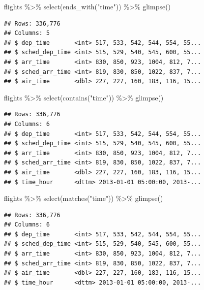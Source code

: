 \documentclass[
]{book}
\newenvironment{Shaded}{\begin{snugshade}}{\end{snugshade}}
\newcommand{\FunctionTok}[1]{\textcolor[rgb]{0.00,0.00,0.00}{#1}}
\newcommand{\NormalTok}[1]{#1}
\newcommand{\SpecialCharTok}[1]{\textcolor[rgb]{0.00,0.00,0.00}{#1}}
\newcommand{\StringTok}[1]{\textcolor[rgb]{0.31,0.60,0.02}{#1}}
\begin{document}
\begin{Shaded}
\begin{Highlighting}[]
\NormalTok{flights }\SpecialCharTok{\%\textgreater{}\%} 
  \FunctionTok{select}\NormalTok{(}\FunctionTok{ends\_with}\NormalTok{(}\StringTok{"time"}\NormalTok{)) }\SpecialCharTok{\%\textgreater{}\%} 
  \FunctionTok{glimpse}\NormalTok{()}
\end{Highlighting}
\end{Shaded}

\begin{verbatim}
## Rows: 336,776
## Columns: 5
## $ dep_time       <int> 517, 533, 542, 544, 554, 55...
## $ sched_dep_time <int> 515, 529, 540, 545, 600, 55...
## $ arr_time       <int> 830, 850, 923, 1004, 812, 7...
## $ sched_arr_time <int> 819, 830, 850, 1022, 837, 7...
## $ air_time       <dbl> 227, 227, 160, 183, 116, 15...
\end{verbatim}

\begin{Shaded}
\begin{Highlighting}[]
\NormalTok{flights }\SpecialCharTok{\%\textgreater{}\%} 
  \FunctionTok{select}\NormalTok{(}\FunctionTok{contains}\NormalTok{(}\StringTok{"time"}\NormalTok{)) }\SpecialCharTok{\%\textgreater{}\%} 
  \FunctionTok{glimpse}\NormalTok{()}
\end{Highlighting}
\end{Shaded}

\begin{verbatim}
## Rows: 336,776
## Columns: 6
## $ dep_time       <int> 517, 533, 542, 544, 554, 55...
## $ sched_dep_time <int> 515, 529, 540, 545, 600, 55...
## $ arr_time       <int> 830, 850, 923, 1004, 812, 7...
## $ sched_arr_time <int> 819, 830, 850, 1022, 837, 7...
## $ air_time       <dbl> 227, 227, 160, 183, 116, 15...
## $ time_hour      <dttm> 2013-01-01 05:00:00, 2013-...
\end{verbatim}

\begin{Shaded}
\begin{Highlighting}[]
\NormalTok{flights }\SpecialCharTok{\%\textgreater{}\%} 
  \FunctionTok{select}\NormalTok{(}\FunctionTok{matches}\NormalTok{(}\StringTok{"time"}\NormalTok{)) }\SpecialCharTok{\%\textgreater{}\%} 
  \FunctionTok{glimpse}\NormalTok{()}
\end{Highlighting}
\end{Shaded}

\begin{verbatim}
## Rows: 336,776
## Columns: 6
## $ dep_time       <int> 517, 533, 542, 544, 554, 55...
## $ sched_dep_time <int> 515, 529, 540, 545, 600, 55...
## $ arr_time       <int> 830, 850, 923, 1004, 812, 7...
## $ sched_arr_time <int> 819, 830, 850, 1022, 837, 7...
## $ air_time       <dbl> 227, 227, 160, 183, 116, 15...
## $ time_hour      <dttm> 2013-01-01 05:00:00, 2013-...
\end{verbatim}
\end{document}
